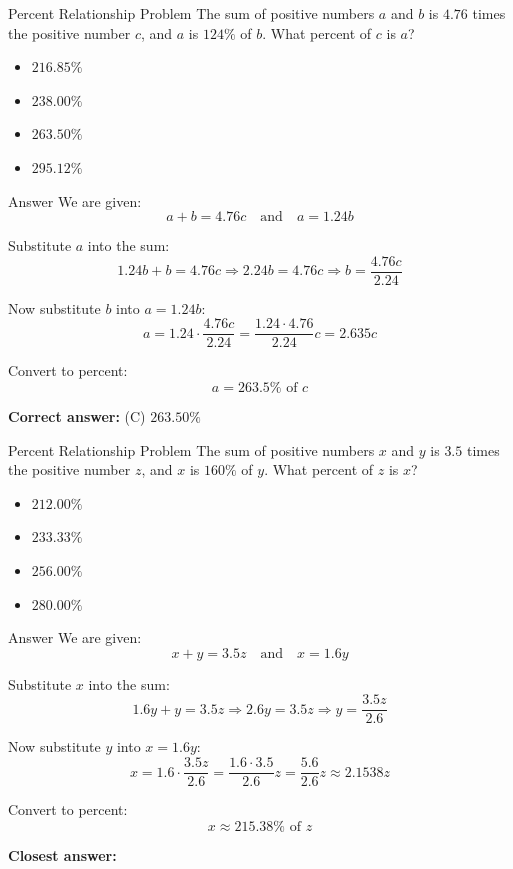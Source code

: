 \documentclass{beamer}
\begin{document}
\begin{frame}{Percent Relationship Problem}
The sum of positive numbers $a$ and $b$ is $4.76$ times the positive number $c$, and $a$ is $124\%$ of $b$. What percent of $c$ is $a$?
\begin{itemize}
    \item[(A)] $216.85\%$
    \item[(B)] $238.00\%$
    \item[(C)] $263.50\%$
    \item[(D)] $295.12\%$
\end{itemize}
\end{frame}


\begin{frame}{Answer}
We are given:
\[
a + b = 4.76c \quad \text{and} \quad a = 1.24b
\]

Substitute $a$ into the sum:
\[
1.24b + b = 4.76c \Rightarrow 2.24b = 4.76c \Rightarrow b = \dfrac{4.76c}{2.24}
\]

Now substitute $b$ into $a = 1.24b$:
\[
a = 1.24 \cdot \dfrac{4.76c}{2.24} = \dfrac{1.24 \cdot 4.76}{2.24}c = 2.635c
\]

Convert to percent:
\[
\boxed{a = 263.5\% \text{ of } c}
\]

\textbf{Correct answer:} (C) $263.50\%$
\end{frame}


\begin{frame}{Percent Relationship Problem}
The sum of positive numbers $x$ and $y$ is $3.5$ times the positive number $z$, and $x$ is $160\%$ of $y$. What percent of $z$ is $x$?
\begin{itemize}
    \item[(A)] $212.00\%$
    \item[(B)] $233.33\%$
    \item[(C)] $256.00\%$
    \item[(D)] $280.00\%$
\end{itemize}
\end{frame}


\begin{frame}{Answer}
We are given:
\[
x + y = 3.5z \quad \text{and} \quad x = 1.6y
\]

Substitute $x$ into the sum:
\[
1.6y + y = 3.5z \Rightarrow 2.6y = 3.5z \Rightarrow y = \dfrac{3.5z}{2.6}
\]

Now substitute $y$ into $x = 1.6y$:
\[
x = 1.6 \cdot \dfrac{3.5z}{2.6} = \dfrac{1.6 \cdot 3.5}{2.6}z = \dfrac{5.6}{2.6}z \approx 2.1538z
\]

Convert to percent:
\[
x \approx 215.38\% \text{ of } z
\]

\textbf{Closest answer:} 
\end{frame}
\end{document}
